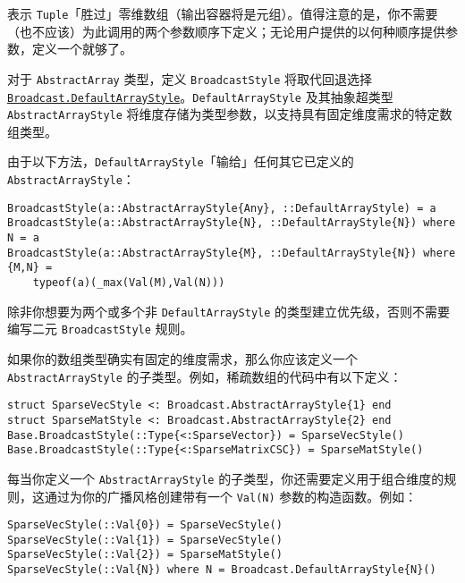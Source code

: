 表示 \texttt{Tuple}「胜过」零维数组（输出容器将是元组）。值得注意的是，你不需要（也不应该）为此调用的两个参数顺序下定义；无论用户提供的以何种顺序提供参数，定义一个就够了。



对于 \texttt{AbstractArray} 类型，定义 \texttt{BroadcastStyle} 将取代回退选择 \hyperlink{5203521679854231580}{\texttt{Broadcast.DefaultArrayStyle}}。\texttt{DefaultArrayStyle} 及其抽象超类型 \texttt{AbstractArrayStyle} 将维度存储为类型参数，以支持具有固定维度需求的特定数组类型。



由于以下方法，\texttt{DefaultArrayStyle}「输给」任何其它已定义的 \texttt{AbstractArrayStyle}：




\begin{verbatim}
BroadcastStyle(a::AbstractArrayStyle{Any}, ::DefaultArrayStyle) = a
BroadcastStyle(a::AbstractArrayStyle{N}, ::DefaultArrayStyle{N}) where N = a
BroadcastStyle(a::AbstractArrayStyle{M}, ::DefaultArrayStyle{N}) where {M,N} =
    typeof(a)(_max(Val(M),Val(N)))
\end{verbatim}



除非你想要为两个或多个非 \texttt{DefaultArrayStyle} 的类型建立优先级，否则不需要编写二元 \texttt{BroadcastStyle} 规则。



如果你的数组类型确实有固定的维度需求，那么你应该定义一个 \texttt{AbstractArrayStyle} 的子类型。例如，稀疏数组的代码中有以下定义：




\begin{verbatim}
struct SparseVecStyle <: Broadcast.AbstractArrayStyle{1} end
struct SparseMatStyle <: Broadcast.AbstractArrayStyle{2} end
Base.BroadcastStyle(::Type{<:SparseVector}) = SparseVecStyle()
Base.BroadcastStyle(::Type{<:SparseMatrixCSC}) = SparseMatStyle()
\end{verbatim}



每当你定义一个 \texttt{AbstractArrayStyle} 的子类型，你还需要定义用于组合维度的规则，这通过为你的广播风格创建带有一个 \texttt{Val(N)} 参数的构造函数。例如：




\begin{verbatim}
SparseVecStyle(::Val{0}) = SparseVecStyle()
SparseVecStyle(::Val{1}) = SparseVecStyle()
SparseVecStyle(::Val{2}) = SparseMatStyle()
SparseVecStyle(::Val{N}) where N = Broadcast.DefaultArrayStyle{N}()
\end{verbatim}



